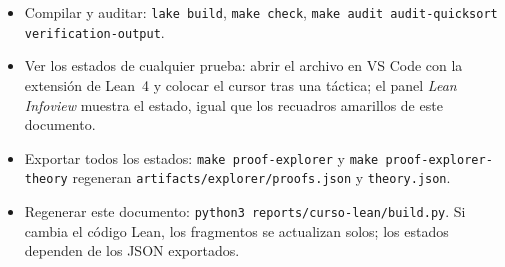 \documentclass[11pt,a4paper]{article}
\begin{document}
\begin{itemize}
  \item Compilar y auditar: \texttt{lake build}, \texttt{make check},
    \texttt{make audit audit-quicksort verification-output}.
  \item Ver los estados de cualquier prueba: abrir el archivo en VS Code con la
    extensión de Lean~4 y colocar el cursor tras una táctica; el panel
    \emph{Lean Infoview} muestra el estado, igual que los recuadros
    amarillos de este documento.
  \item Exportar todos los estados: \texttt{make proof-explorer} y
    \texttt{make proof-explorer-theory} regeneran
    \texttt{artifacts/explorer/proofs.json} y \texttt{theory.json}.
  \item Regenerar este documento:
    \texttt{python3 reports/curso-lean/build.py}. Si cambia el código Lean, los
    fragmentos se actualizan solos; los estados dependen de los JSON
    exportados.
\end{itemize}
\end{document}
